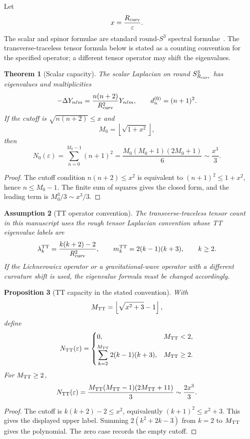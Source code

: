 \documentclass[11pt,a4paper]{article}
\newtheorem{theorem}{Theorem}[section]
\newtheorem{proposition}[theorem]{Proposition}
\newtheorem{assumption}[theorem]{Assumption}
\begin{document}
Let
\[
x=\frac{R_{\rm curv}}{\varepsilon}.
\]
The scalar and spinor formulae are standard round-$S^3$ spectral formulae~\cite{Rosenberg1997,LawsonMichelsohn1989}.  The transverse-traceless tensor formula below is stated as a counting convention for the specified operator; a different tensor operator may shift the eigenvalues.

\begin{theorem}[Scalar capacity]
The scalar Laplacian on round $S^3_{R_{\rm curv}}$ has eigenvalues and multiplicities
\[
-\Delta Y_{n\ell m}=\frac{n(n+2)}{R_{\rm curv}^2}Y_{n\ell m},
\qquad
d_n^{(0)}=(n+1)^2.
\]
If the cutoff is $\sqrt{n(n+2)}\le x$ and
\[
M_0=\left\lfloor\sqrt{1+x^2}\right\rfloor,
\]
then
\[
N_0(\varepsilon)
=
\sum_{n=0}^{M_0-1}(n+1)^2
=
\frac{M_0(M_0+1)(2M_0+1)}{6}
\sim\frac{x^3}{3}.
\]
\end{theorem}
\begin{proof}
The cutoff condition $n(n+2)\le x^2$ is equivalent to $(n+1)^2\le1+x^2$, hence $n\le M_0-1$.  The finite sum of squares gives the closed form, and the leading term is $M_0^3/3\sim x^3/3$.
\end{proof}

\begin{assumption}[TT operator convention]
The transverse-traceless tensor count in this manuscript uses the rough tensor Laplacian convention whose TT eigenvalue labels are
\[
\lambda_k^{\rm TT}=\frac{k(k+2)-2}{R_{\rm curv}^2},
\qquad
m_k^{\rm TT}=2(k-1)(k+3),
\qquad k\ge2.
\]
If the Lichnerowicz operator or a gravitational-wave operator with a different curvature shift is used, the eigenvalue formula must be changed accordingly.
\end{assumption}

\begin{proposition}[TT capacity in the stated convention]
With
\[
M_{\rm TT}=\left\lfloor\sqrt{x^2+3}-1\right\rfloor,
\]
define
\[
N_{\rm TT}(\varepsilon)=
\begin{cases}
0, & M_{\rm TT}<2,\\[0.4em]
\displaystyle\sum_{k=2}^{M_{\rm TT}}2(k-1)(k+3), & M_{\rm TT}\ge2.
\end{cases}
\]
For $M_{\rm TT}\ge2$,
\[
N_{\rm TT}(\varepsilon)
=
\frac{M_{\rm TT}(M_{\rm TT}-1)(2M_{\rm TT}+11)}{3}
\sim\frac{2x^3}{3}.
\]
\end{proposition}
\begin{proof}
The cutoff is $k(k+2)-2\le x^2$, equivalently $(k+1)^2\le x^2+3$.  This gives the displayed upper label.  Summing $2(k^2+2k-3)$ from $k=2$ to $M_{\rm TT}$ gives the polynomial.  The zero case records the empty cutoff.
\end{proof}
\end{document}

